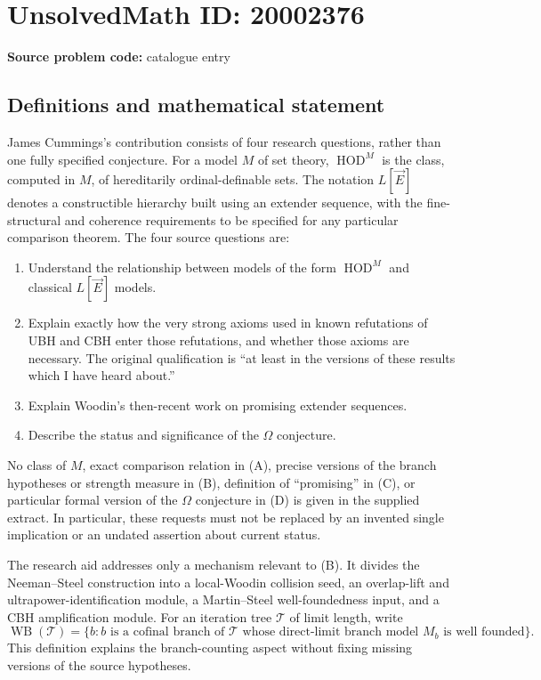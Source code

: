 \documentclass[11pt]{article}
\begin{document}
\section*{UnsolvedMath ID: 20002376}
\textbf{Source problem code:} catalogue entry
\subsection{Definitions and mathematical statement}
James Cummings's contribution consists of four research questions, rather than one fully specified conjecture. For a model $M$ of set theory, $\operatorname{HOD}^M$ is the class, computed in $M$, of hereditarily ordinal-definable sets. The notation $L[\vec E]$ denotes a constructible hierarchy built using an extender sequence, with the fine-structural and coherence requirements to be specified for any particular comparison theorem. The four source questions are:
\begin{enumerate}
\item[(A)] Understand the relationship between models of the form $\operatorname{HOD}^M$ and classical $L[\vec E]$ models.
\item[(B)] Explain exactly how the very strong axioms used in known refutations of UBH and CBH enter those refutations, and whether those axioms are necessary. The original qualification is ``at least in the versions of these results which I have heard about.''
\item[(C)] Explain Woodin's then-recent work on promising extender sequences.
\item[(D)] Describe the status and significance of the $\Omega$ conjecture.
\end{enumerate}
No class of $M$, exact comparison relation in (A), precise versions of the branch hypotheses or strength measure in (B), definition of ``promising'' in (C), or particular formal version of the $\Omega$ conjecture in (D) is given in the supplied extract. In particular, these requests must not be replaced by an invented single implication or an undated assertion about current status.

The research aid addresses only a mechanism relevant to (B). It divides the Neeman--Steel construction into a local-Woodin collision seed, an overlap-lift and ultrapower-identification module, a Martin--Steel well-foundedness input, and a CBH amplification module. For an iteration tree $\mathcal T$ of limit length, write
\[
 \operatorname{WB}(\mathcal T)
 =\{b:b\text{ is a cofinal branch of }\mathcal T
          \text{ whose direct-limit branch model }M_b
          \text{ is well founded}\}.
\]
This definition explains the branch-counting aspect without fixing missing versions of the source hypotheses.
\end{document}
